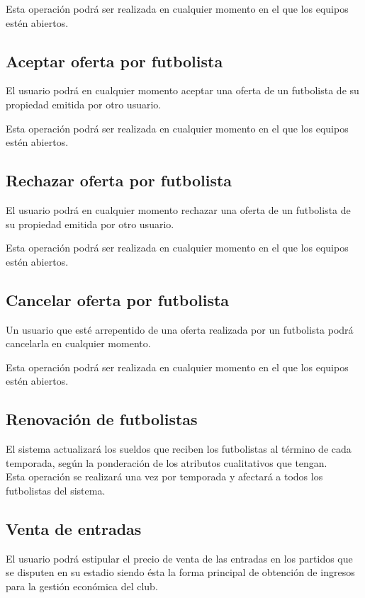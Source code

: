Esta operación podrá ser realizada en cualquier momento en el que los equipos
estén abiertos.

\subsection{Aceptar oferta por futbolista}
El usuario podrá en cualquier momento aceptar una oferta de un futbolista de su
propiedad emitida por otro usuario.

Esta operación podrá ser realizada en cualquier momento en el que los equipos
estén abiertos.

\subsection{Rechazar oferta por futbolista}
El usuario podrá en cualquier momento rechazar una oferta de un futbolista de su
propiedad emitida por otro usuario.

Esta operación podrá ser realizada en cualquier momento en el que los equipos
estén abiertos.

\subsection{Cancelar oferta por futbolista}
Un usuario que esté arrepentido de una oferta realizada por un futbolista podrá
cancelarla en cualquier momento.

Esta operación podrá ser realizada en cualquier momento en el que los equipos
estén abiertos.

\subsection{Renovación de futbolistas}
El sistema actualizará los sueldos que reciben los futbolistas al término de
cada temporada, según la ponderación de los atributos
cualitativos que tengan.\\

Esta operación se realizará una vez por temporada y afectará a todos los
futbolistas del sistema.
\subsection{Venta de entradas}
El usuario podrá estipular el precio de venta de las entradas en los partidos
que se disputen en su estadio siendo ésta la forma principal
de obtención de ingresos para la gestión económica del club.\\

